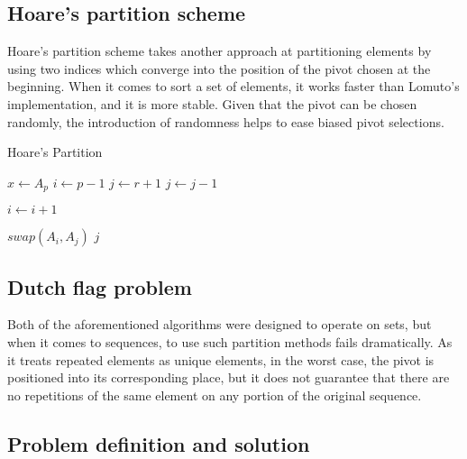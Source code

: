 \subsection{Hoare's partition scheme}

Hoare's partition scheme takes another approach at partitioning elements by using two indices which converge into the position of the pivot chosen at the beginning. When it comes to sort a set of elements, it works faster than Lomuto's implementation, and it is more stable. Given that the pivot can be chosen randomly, the introduction of randomness helps to ease biased pivot selections.\\

\begin{algorithm}
\caption{Hoare's Partition}\label{ALG:HOARE_PARTITION}
\begin{algorithmic}[1]
     
    \State $x \gets A_p$
    \State $i \gets p-1$
    \State $j \gets r+1$
        \Do 
            \State $j \gets j - 1$

        \Do 
            \State $i \gets i + 1$

            \State $swap(A_i, A_j)$
        \Else
            \State \Return $j$
        \EndIf
    \EndWhile
    \EndProcedure
\end{algorithmic}
\end{algorithm}

\subsection{Dutch flag problem}
\label{SUBSEC:DUTCH_FLAG_PROBLEM}

Both of the aforementioned algorithms were designed to operate on sets, but when it comes to sequences, to use such partition methods fails dramatically. As it treats repeated elements as unique elements, in the worst case, the pivot is positioned into its corresponding place, but it does not guarantee that there are no repetitions of the same element on any portion of the original sequence.\\

\subsection{Problem definition and solution}
\label{SUBSECITON:PARTITIONING_PROBLEM}

